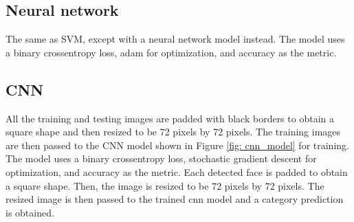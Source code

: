 \documentclass{article}
\begin{document}
\subsection*{Neural network}
The same as SVM, except with a neural network model instead. The model uses a binary crossentropy loss, adam for optimization, and accuracy as the metric. 

\subsection*{CNN}
All the training and testing images are padded with black borders to obtain a square shape and then resized to be 72 pixels by 72 pixels. The training images are then passed to the CNN model shown in Figure \ref{fig: cnn_model} for training. The model uses a binary crossentropy loss, stochastic gradient descent for optimization, and accuracy as the metric.
Each detected face is padded to obtain a square shape. Then, the image is resized to be 72 pixels by 72 pixels. The resized image is then passed to the trained cnn model and a category prediction is obtained.
\end{document}
